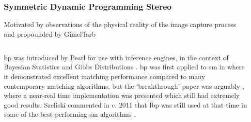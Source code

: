 \subsubsection{Symmetric Dynamic Programming Stereo}
Motivated by observations of the physical reality of the image capture process and propounded by Gimel'farb 

\subsection{}
\gls{bp} was introduced by Pearl \cite{Pearl1982} for use with inference engines, in the context of Bayesian Statistics \fxerror[inline]{[ref]} and Gibbs Distributions \fxerror[inline]{[ref]}.  \gls{bp} was first applied to \gls{sm} in \cite{Sun2003} where it demonstrated excellent matching performance compared to many contemporary matching algorithms, but the `breakthrough' paper was arguably \cite{Felzenszwalb2006}, where a near-real time implementation was presented which still had extremely good results.  Szeliski commented in c. 2011 that \gls{lbp} was still used at that time in some of the best-performing \gls{sm} algorithms \cite[p. 163]{Szeliski2011}.

